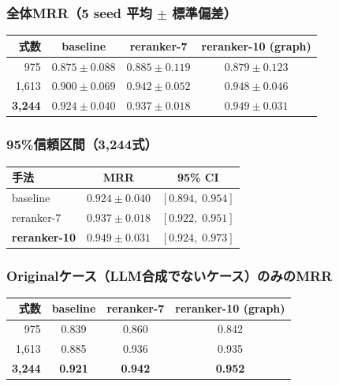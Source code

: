 \documentclass[11pt,a4paper]{ltjsarticle}
\begin{document}
\subsubsection{全体MRR（5 seed 平均 $\pm$ 標準偏差）}

\begin{table}[h]
\centering
\begin{tabular}{rccc}
\toprule
式数 & baseline & reranker-7 & reranker-10 (graph) \\
\midrule
975 & $0.875 \pm 0.088$ & $0.885 \pm 0.119$ & $0.879 \pm 0.123$ \\
1,613 & $0.900 \pm 0.069$ & $0.942 \pm 0.052$ & $0.948 \pm 0.046$ \\
\textbf{3,244} & $\mathbf{0.924 \pm 0.040}$ & $\mathbf{0.937 \pm 0.018}$ & $\mathbf{0.949 \pm 0.031}$ \\
\bottomrule
\end{tabular}
\end{table}

\subsubsection{95\%信頼区間（3,244式）}

\begin{table}[h]
\centering
\begin{tabular}{lcc}
\toprule
手法 & MRR & 95\% CI \\
\midrule
baseline & $0.924 \pm 0.040$ & $[0.894,\; 0.954]$ \\
reranker-7 & $0.937 \pm 0.018$ & $[0.922,\; 0.951]$ \\
\textbf{reranker-10} & $\mathbf{0.949 \pm 0.031}$ & $\mathbf{[0.924,\; 0.973]}$ \\
\bottomrule
\end{tabular}
\end{table}

\subsubsection{Originalケース（LLM合成でないケース）のみのMRR}

\begin{table}[h]
\centering
\begin{tabular}{rccc}
\toprule
式数 & baseline & reranker-7 & reranker-10 (graph) \\
\midrule
975 & 0.839 & 0.860 & 0.842 \\
1,613 & 0.885 & 0.936 & 0.935 \\
\textbf{3,244} & \textbf{0.921} & \textbf{0.942} & \textbf{0.952} \\
\bottomrule
\end{tabular}
\end{table}
\end{document}
